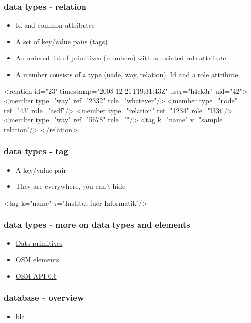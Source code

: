 \documentclass{beamer}
\begin{document}
\begin{frame}[fragile]
    \frametitle{data types - relation}
    \begin{itemize}
        \item Id and common attributes 
        \item A set of key/value pairs (tags)
        \item An ordered list of primitives (members) with associated role attribute
        \item A member consists of a type (node, way, relation), Id and a role attribute
    \end{itemize}
    \begin{xmlcode}
    <relation id="23" timestamp="2008-12-21T19:31:43Z" user="h4ck3r" uid="42">
        <member type="way" ref="2332" role="whatever"/>
        <member type="node" ref="43" role="asdf"/>
        <member type="relation" ref="1234" role="l33t"/>
        <member type="way" ref="5678" role=""/>
        <tag k="name" v="sample relation"/>
    </relation>
    \end{xmlcode}
\end{frame}
\begin{frame}[fragile]
    \frametitle{data types - tag}
    \begin{itemize}
        \item A key/value pair
        \item They are everywhere, you can't hide
    \end{itemize}
    \begin{xmlcode}
    <tag k="name" v="Institut fuer Informatik"/>
    \end{xmlcode}
\end{frame}
\begin{frame}[fragile]
    \frametitle{data types - more on data types and elements}
    \begin{itemize}
        \item \href{http://wiki.openstreetmap.org/wiki/Data_Primitives}{Data primitives}
        \item \href{http://wiki.openstreetmap.org/wiki/Elements}{OSM elements}
        \item \href{http://wiki.openstreetmap.org/wiki/API\_v0.6}{OSM API 0.6}
    \end{itemize}
\end{frame}
\begin{frame}[fragile]
    \frametitle{database - overview}
    \begin{itemize}
        \item bla 
    \end{itemize}
\end{frame}
\end{document}
